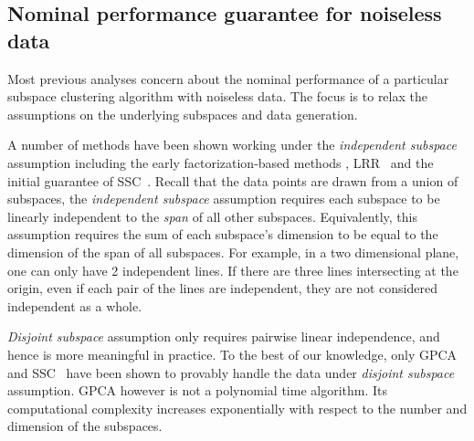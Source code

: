 \documentclass{ctexart}
\begin{document}
\subsection{Nominal performance guarantee for noiseless data}
Most previous analyses concern about the nominal performance of a particular subspace clustering algorithm with noiseless data. The focus is to relax the assumptions on the underlying subspaces and data generation.

A number of methods have been shown working under the \emph{independent subspace} assumption including the early factorization-based methods \cite{costeira1998motion_seg,kanatani2001motion}, LRR~\cite{liu2010lrr_icml} and the initial guarantee of SSC~\cite{elhamifar2009ssc}. Recall that the data points are drawn from a union of subspaces, the \emph{independent subspace } assumption requires each subspace to be linearly independent to the {\em span} of all other subspaces. Equivalently, this assumption requires the sum of each subspace's dimension to be equal to the dimension of the span of all subspaces. For example, in a two dimensional plane, one can only have 2 independent lines. If there are three lines intersecting at the origin, even if each pair of the lines are independent, they are not considered independent as a whole.

\emph{Disjoint subspace} assumption only requires pairwise linear independence, and hence is more meaningful in practice. To the best of our knowledge, only GPCA~\cite{vidal2005gpca} and SSC~\cite{elhamifar2010ssc_icassp,elhamifar2012ssc_journal} have been shown to provably handle the data under \emph{disjoint subspace} assumption. GPCA however is not a polynomial time algorithm. Its computational complexity increases exponentially with respect to the number and dimension of the subspaces.
\end{document}
